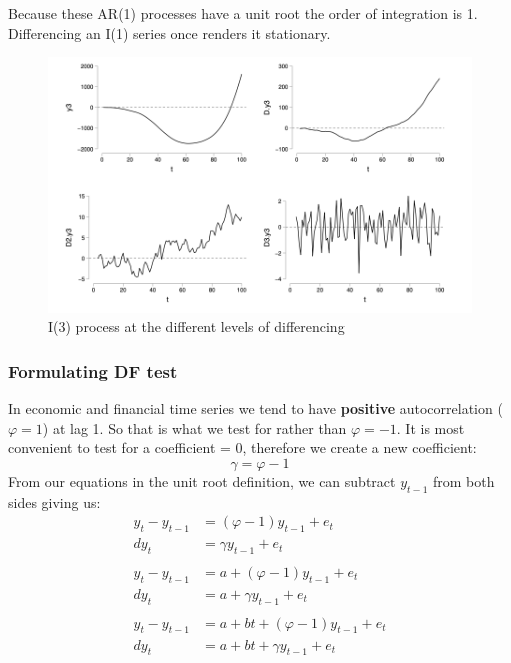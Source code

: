\documentclass[11pt]{article}
\begin{document}
Because these AR(1) processes have a unit root the order of integration is 1. Differencing an I(1) series once renders it stationary.

\begin{figure}[h]
    \centering
    \includegraphics[width=15cm]{photos/i3.png}
    \caption{I(3) process at the different levels of differencing}
    \label{fig:i3 being differenced}
\end{figure}

\subsubsection{Formulating DF test}

In economic and financial time series we tend to have \textbf{positive} autocorrelation ($\varphi=1$) at lag 1. So that is what we test for rather than $\varphi=-1$. It is most convenient to test for a coefficient = 0, therefore we create a new coefficient:
\[\gamma = \varphi - 1\]
From our equations in the unit root definition, we can subtract $y_{t-1}$ from both sides giving us:
\begin{align*}
    y_t - y_{t-1} &= (\varphi-1)y_{t-1} + e_t \\
    dy_t &= \gamma y_{t-1} + e_t \\
    \\
    y_t - y_{t-1} &= a + (\varphi - 1) y_{t-1} + e_t \\
    dy_t &= a + \gamma y_{t-1} + e_t \\
    \\
    y_t - y_{t-1} &= a + bt + (\varphi-1)y_{t-1} + e_t \\
    dy_t &= a + bt + \gamma y_{t-1} + e_t
\end{align*}
\end{document}
